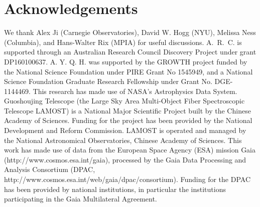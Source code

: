 \documentclass[a4paper,fleqn,usenatbib]{mnras}
\begin{document}
\section*{Acknowledgements}
We thank Alex Ji (Carnegie Observatories), David W. Hogg (NYU), Melissa Ness (Columbia), and Hans-Walter Rix (MPIA) for useful discussions. 
A.~R.~C. is supported through an Australian Research Council Discovery Project under grant DP160100637.
A. Y. Q. H. was supported by the GROWTH project funded by the National Science Foundation under PIRE Grant No 1545949, and a National Science Foundation Graduate Research Fellowship under Grant No. DGE-1144469. 
This research has made use of NASA's Astrophysics Data System.
Guoshoujing Telescope (the Large Sky Area Multi-Object Fiber Spectroscopic Telescope LAMOST) is a National Major Scientific Project built by the Chinese Academy of Sciences. Funding for the project has been provided by the National Development and Reform Commission. LAMOST is operated and managed by the National Astronomical Observatories, Chinese Academy of Sciences. 
This work has made use of data from the European Space Agency (ESA) mission Gaia (http://www.cosmos.esa.int/gaia), processed by the Gaia Data Processing and Analysis Consortium (DPAC, http://www.cosmos.esa.int/web/gaia/dpac/consortium). Funding for the DPAC has been provided by national institutions, in particular the institutions participating in the Gaia Multilateral Agreement.


 

\end{document}
